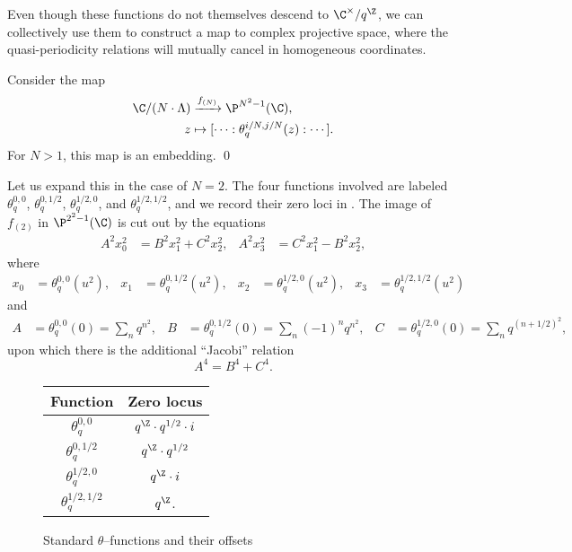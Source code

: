 Even though these functions do not themselves descend to $\C^\times / q^{\Z}$, we can collectively use them to construct a map to complex projective space, where the quasi-periodicity relations will mutually cancel in homogeneous coordinates.
\begin{theorem}
Consider the map
\begin{align*}
\C / (N \cdot \Lambda) & \xrightarrow{f_{(N)}} \P^{N^2-1}(\C), \\
z & \mapsto [\cdots : \theta_q^{i/N, j/N}(z) : \cdots].
\end{align*}
For $N > 1$, this map is an embedding. \qed
\end{theorem}

\begin{example}
Let us expand this in the case of $N = 2$.  The four functions involved are labeled $\theta_q^{0,0}$, $\theta_q^{0,1/2}$, $\theta_q^{1/2,0}$, and $\theta_q^{1/2,1/2}$, and we record their zero loci in .  The image of $f_{(2)}$ in $\P^{2^2 - 1}(\C)$ is cut out by the equations
\begin{align*}
A^2 x_0^2 & = B^2 x_1^2 + C^2 x_2^2, &
A^2 x_3^2 & = C^2 x_1^2 - B^2 x_2^2,
\end{align*}
where
\begin{align*}
x_0 & = \theta_q^{0, 0}(u^2), &
x_1 & = \theta_q^{0, 1/2}(u^2), &
x_2 & = \theta_q^{1/2, 0}(u^2), &
x_3 & = \theta_q^{1/2, 1/2}(u^2)
\end{align*}
and
\begin{align*}
A & = \theta_q^{0, 0}(0) = \sum_n q^{n^2}, &
B & = \theta_q^{0, 1/2}(0) = \sum_n (-1)^n q^{n^2}, &
C & = \theta_q^{1/2, 0}(0) = \sum_n q^{(n + 1/2)^2},
\end{align*}
upon which there is the additional ``Jacobi'' relation \[A^4 = B^4 + C^4.\]
\end{example}

\begin{figure}
\begin{center}
\begin{tabular}{@{}cc@{}} \toprule
Function & Zero locus \\
\midrule
$\theta_q^{0,0}$ & $q^{\Z} \cdot q^{1/2} \cdot i$ \\
$\theta_q^{0,1/2}$ & $q^{\Z} \cdot q^{1/2}$ \\
$\theta_q^{1/2,0}$ & $q^{\Z} \cdot i$ \\
$\theta_q^{1/2,1/2}$ & $q^{\Z}$. \\ \bottomrule
\end{tabular}
\end{center}
\caption{Standard $\theta$--functions and their offsets}\label{ThetaFunctionsTable}
\end{figure}

